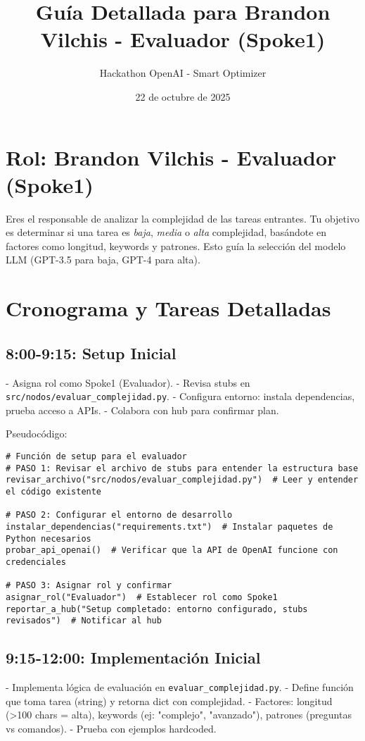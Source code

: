 \documentclass{article}
\title{Guía Detallada para Brandon Vilchis - Evaluador (Spoke1)}
\author{Hackathon OpenAI - Smart Optimizer}
\date{22 de octubre de 2025}
\begin{document}
\maketitle

\section{Rol: Brandon Vilchis - Evaluador (Spoke1)}
Eres el responsable de analizar la complejidad de las tareas entrantes. Tu objetivo es determinar si una tarea es \textit{baja}, \textit{media} o \textit{alta} complejidad, basándote en factores como longitud, keywords y patrones. Esto guía la selección del modelo LLM (GPT-3.5 para baja, GPT-4 para alta).

\section{Cronograma y Tareas Detalladas}

\subsection{8:00-9:15: Setup Inicial}
- Asigna rol como Spoke1 (Evaluador).
- Revisa stubs en \texttt{src/nodos/evaluar\_complejidad.py}.
- Configura entorno: instala dependencias, prueba acceso a APIs.
- Colabora con hub para confirmar plan.

Pseudocódigo:
\begin{lstlisting}
# Función de setup para el evaluador
# PASO 1: Revisar el archivo de stubs para entender la estructura base
revisar_archivo("src/nodos/evaluar_complejidad.py")  # Leer y entender el código existente

# PASO 2: Configurar el entorno de desarrollo
instalar_dependencias("requirements.txt")  # Instalar paquetes de Python necesarios
probar_api_openai()  # Verificar que la API de OpenAI funcione con credenciales

# PASO 3: Asignar rol y confirmar
asignar_rol("Evaluador")  # Establecer rol como Spoke1
reportar_a_hub("Setup completado: entorno configurado, stubs revisados")  # Notificar al hub
\end{lstlisting}

\subsection{9:15-12:00: Implementación Inicial}
- Implementa lógica de evaluación en \texttt{evaluar\_complejidad.py}.
- Define función que toma tarea (string) y retorna dict con complejidad.
- Factores: longitud (>100 chars = alta), keywords (ej: "complejo", "avanzado"), patrones (preguntas vs comandos).
- Prueba con ejemplos hardcoded.
\end{document}
